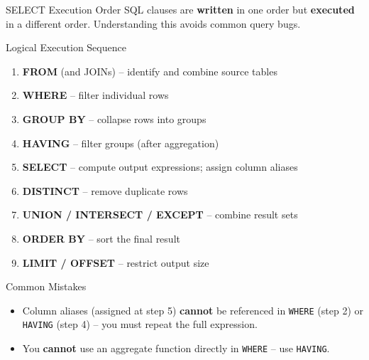 \begin{frame}{SELECT Execution Order}
  SQL clauses are \textbf{written} in one order but \textbf{executed} in a different order.
  Understanding this avoids common query bugs.

  \begin{block}{Logical Execution Sequence}
    \begin{enumerate}
      \item \textbf{FROM} (and JOINs) -- identify and combine source tables
      \item \textbf{WHERE} -- filter individual rows
      \item \textbf{GROUP BY} -- collapse rows into groups
      \item \textbf{HAVING} -- filter groups (after aggregation)
      \item \textbf{SELECT} -- compute output expressions; assign column aliases
      \item \textbf{DISTINCT} -- remove duplicate rows
      \item \textbf{UNION / INTERSECT / EXCEPT} -- combine result sets
      \item \textbf{ORDER BY} -- sort the final result
      \item \textbf{LIMIT / OFFSET} -- restrict output size
    \end{enumerate}
  \end{block}

  \begin{alertblock}{Common Mistakes}
    \begin{itemize}
      \item Column aliases (assigned at step 5) \textbf{cannot} be referenced in \texttt{WHERE} (step 2)
            or \texttt{HAVING} (step 4) -- you must repeat the full expression.
      \item You \textbf{cannot} use an aggregate function directly in \texttt{WHERE} -- use \texttt{HAVING}.
    \end{itemize}
  \end{alertblock}
\end{frame}

